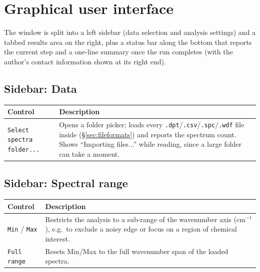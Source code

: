 \documentclass[11pt,a4paper]{article}
\makeatletter
\newcommand{\code}[1]{\texttt{#1}}
\newenvironment{argtabletwo}[4]{%
  \begin{center}
  \renewcommand{\arraystretch}{1.25}
  \setlength{\dimen2}{\dimexpr\textwidth-#3-4\tabcolsep-2\arrayrulewidth\relax}
  \begin{tabular}{@{}p{#3}p{\dimen2}@{}}
  \toprule
  \textbf{#1} & \textbf{#2} \\
  \midrule
}{%
  \bottomrule
  \end{tabular}
  \end{center}
}
\makeatother
\begin{document}
\section{Graphical user interface}
\label{sec:gui}
The window is split into a left sidebar (data selection and analysis
settings) and a tabbed results area on the right, plus a status bar along the
bottom that reports the current step and a one-line summary once the run
completes (with the author's contact information shown at its right end).

\subsection{Sidebar: Data}
\begin{argtabletwo}{Control}{Description}{3.2cm}{X}
\code{Select spectra folder...} & Opens a folder picker; loads every
\code{.dpt}/\code{.csv}/\code{.spc}/\code{.wdf} file inside
(\S\ref{sec:fileformats}) and reports the spectrum count. Shows
``Importing files...'' while reading, since a large folder can take a
moment. \\
\end{argtabletwo}

\subsection{Sidebar: Spectral range}
\begin{argtabletwo}{Control}{Description}{3.2cm}{X}
\code{Min} / \code{Max} & Restricts the analysis to a sub-range of the
wavenumber axis (cm$^{-1}$), e.g.\ to exclude a noisy edge or focus on a
region of chemical interest. \\
\code{Full range} & Resets Min/Max to the full wavenumber span of the
loaded spectra. \\
\end{argtabletwo}

\end{document}
